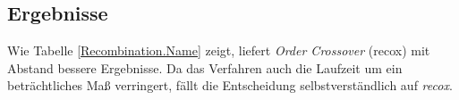 \subsection{Ergebnisse}

Wie Tabelle \ref{Recombination.Name} zeigt, liefert \emph{Order Crossover}
(recox) mit Abstand bessere Ergebnisse.
Da das Verfahren auch die Laufzeit um ein beträchtliches Maß verringert,
fällt die Entscheidung selbstverständlich auf \emph{recox}.



